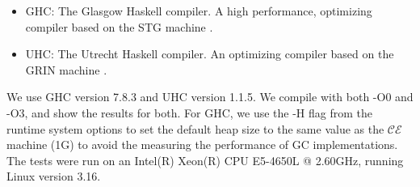 \begin{itemize}
\item GHC: The Glasgow Haskell compiler. A high performance, optimizing compiler
based on the STG machine \cite{jonesstg}.
\item UHC: The Utrecht Haskell compiler. An optimizing compiler based on the
GRIN machine \cite{boquist1997grin, dijkstra2009architecture}.
\end{itemize}

We use GHC version 7.8.3 and UHC version 1.1.5. We compile with both -O0 and
-O3, and show the results for both. For GHC, we use the -H flag from the runtime
system options to set the default heap size to the same value as the
$\mathcal{CE}$ machine (1G) to avoid the measuring the performance of GC
implementations. The tests were run on an Intel(R) Xeon(R) CPU E5-4650L @
2.60GHz, running Linux version 3.16. 
